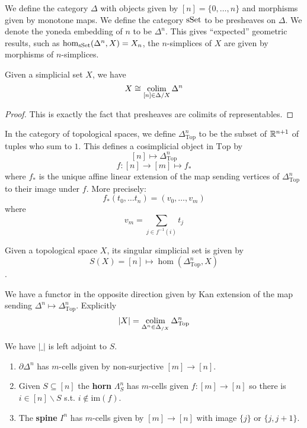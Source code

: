 We define the category $\Delta$ with objects given by $[n] = \{0, \ldots, n\}$ and morphisms given by monotone maps.
We define the category $\mathrm{sSet}$ to be presheaves on $\Delta$.
We denote the yoneda embedding of $n$ to be $\Delta^n$. 
This gives ``expected'' geometric results, such as $\hom_{\mathrm{sSet}}(\Delta^n, X) = X_n$, the $n$-simplices of $X$ are given by morphisms of $n$-simplices.

\begin{lemma}
    Given a simplicial set $X$, we have 
    \[X \cong \colim_{ [n] \in \Delta/X} \Delta^n \] 
\end{lemma}
\begin{proof}
    This is exactly the fact that presheaves are colimits of representables.
\end{proof}

\begin{definition}
    In the category of topological spaces, we define $\Delta^n_\mathrm{Top}$ to be the subset of $\mathbb{R}^{n+1}$ of tuples who sum to $1$.
    This defines a cosimplicial object in $\mathrm{Top}$ by 
    \[ [n] \mapsto \Delta^n_{\mathrm{Top}} \]
    \[ f : [n] \to [m] \mapsto f_*\]
    where $f_*$ is the unique affine linear extension of the map sending vertices of $\Delta^n_{\mathrm{Top}}$ to their image under $f$.
    More precisely:
    \[ f_*(t_0, \ldots t_n) = (v_0, \ldots, v_m)\]
    where
    \[ v_m = \sum_{j \in f^{-1}(i)} t_j\] 
\end{definition}

\begin{definition}
    Given a topological space $X$, its singular simplicial set is given by 
    \[S(X) = [n] \mapsto \hom(\Delta^n_{\mathrm{Top}}, X)\].

    We have a functor in the opposite direction given by Kan extension of the map sending $\Delta^n \mapsto \Delta^n_{\mathrm{Top}}$.
    Explicitly
    \[ |X| = \colim_{\Delta^n \in \Delta_{/X}} \Delta^n_{\mathrm{Top}}\]

    We have $| \_ |$ is left adjoint to $S$.
\end{definition}

\begin{definition}
    \begin{enumerate}
        \item $\partial \Delta^n$ has $m$-cells given by non-surjective $[m] \to [n]$.
        \item Given $S \subseteq [n]$ the \textbf{horn} $\Lambda^n_S$ has $m$-cells given $f : [m] \to [n]$ so there is $i \in [n] \backslash S$ s.t. $i \notin \mathrm{im}(f)$.
        \item The \textbf{spine} $I^n$ has $m$-cells given by $[m] \to [n]$ with image $\{j\}$ or $\{j, j+1\}$.
    \end{enumerate}
\end{definition}

